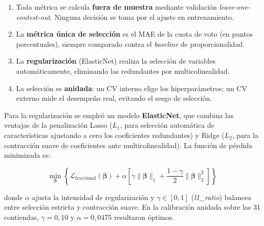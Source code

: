 \begin{enumerate}
    \item Toda métrica se calcula \textbf{fuera de muestra} mediante validación \textit{leave-one-contest-out}. Ninguna decisión se toma por el ajuste en entrenamiento.
    \item La \textbf{métrica única de selección} es el MAE de la cuota de voto (en puntos porcentuales), siempre comparado contra el \textit{baseline} de proporcionalidad.
    \item La \textbf{regularización} (ElasticNet) realiza la selección de variables automáticamente, eliminando las redundantes por multicolinealidad.
    \item La selección es \textbf{anidada}: un CV interno elige los hiperparámetros; un CV externo mide el desempeño real, evitando el sesgo de selección.
\end{enumerate}

Para la regularización se empleó un modelo \textbf{ElasticNet}, que combina las ventajas de la penalización Lasso ($L_1$, para selección automática de características ajustando a cero los coeficientes redundantes) y Ridge ($L_2$, para la contracción suave de coeficientes ante multicolinealidad). La función de pérdida minimizada es:

\begin{equation}
    \min_{\boldsymbol{\beta}} \left\{ \mathcal{L}_{\text{fraccional}}(\boldsymbol{\beta}) + \alpha \left[ \gamma \|\boldsymbol{\beta}\|_1 + \frac{1-\gamma}{2} \|\boldsymbol{\beta}\|_2^2 \right] \right\}
\end{equation}

donde $\alpha$ ajusta la intensidad de regularización y $\gamma \in [0,1]$ (\textit{l1\_ratio}) balancea entre selección estricta y contracción suave. En la calibración anidada sobre las 31 contiendas, $\gamma = 0{,}10$ y $\alpha = 0{,}0475$ resultaron óptimos.

